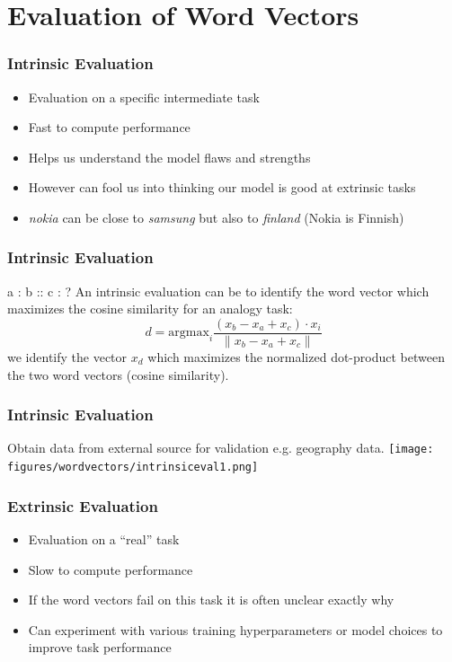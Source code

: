 \section{Evaluation of Word Vectors}
\frame{\tableofcontents[currentsection]}

\begin{frame}
	\frametitle{Intrinsic Evaluation}
	\begin{itemize}[<+->]
		\item Evaluation on a specific intermediate task
		\item Fast to compute performance
		\item Helps us understand the model flaws and strengths
		\item However can fool us into thinking our model is good at extrinsic tasks
		\item {\it nokia} can be close to {\it samsung} but also to {\it finland} (Nokia is Finnish)
	\end{itemize}
\end{frame}


\begin{frame}
	\frametitle{Intrinsic Evaluation}
	\begin{block}{a : b :: c : ?}
	An intrinsic evaluation can be to identify the word vector which maximizes the cosine similarity for an analogy task:
	\[ d = \textrm{argmax}_i \frac{ (x_b - x_a + x_c) \cdot x_i }{ \| x_b - x_a + x_c \| } \]	
	we identify the vector $x_d$ which maximizes the normalized dot-product between the two word vectors (cosine similarity).	
	\end{block}
\end{frame}

\begin{frame}
	\frametitle{Intrinsic Evaluation}
Obtain data from external source for validation e.g. geography data.
	\centering
	\texttt{[image: figures/wordvectors/intrinsiceval1.png]}
\end{frame}


\begin{frame}
	\frametitle{Extrinsic Evaluation}
	\begin{itemize}[<+->]
		\item Evaluation on a ``real'' task
		\item Slow to compute performance
		\item If the word vectors fail on this task it is often unclear exactly why
		\item Can experiment with various training hyperparameters or model choices to improve task performance
	\end{itemize}
\end{frame}

